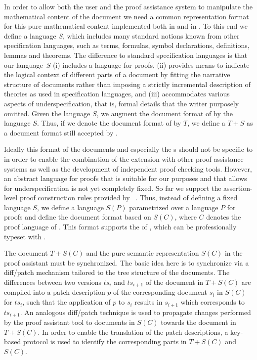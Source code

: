 In order to allow both the user and the proof assistance system to manipulate the
mathematical content of the document we need a common representation format for this pure
mathematical content implemented both in {\texmacs} and in {\OMEGA}. To this end we define
a language $S$, which includes many standard notions known from other specification
languages, such as terms, formulas, symbol declarations, definitions, lemmas and theorems.
The difference to standard specification languages is that our language~$S$ (i) includes a
language for proofs, (ii) provides means to indicate the logical context of different
parts of a document by fitting the narrative structure of documents rather than imposing a
strictly incremental description of theories as used in specification languages, and (iii)
accommodates various aspects of underspecification, that is, formal details that the
writer purposely omitted.  Given the language $S$, we augment the document format of
{\texmacs} by the language $S$.  Thus, if we denote the document format of {\texmacs} by
$T$, we define a {} $T+S$ as a document format still
accepted by {\texmacs}.

Ideally this format of the documents and especially the {s}
should not be specific to {\OMEGA} in order to enable the combination of the {\texmacs}
extension with other proof assistance systems as well as the development of independent
proof checking tools. However, an abstract language for proofs that is suitable for our
purposes and that allows for underspecification is not yet completely fixed. So far we
support the assertion-level proof construction rules provided by
{\CORE}~\cite{Aut03,Aut-05-a}. Thus, instead of defining a fixed language $S$, we define a
language $S(P)$ parametrized over a language $P$ for proofs and define the document
format based on $S(C)$, where $C$ denotes the proof language of {\CORE}. This format
supports the {\emph{}} of
{}, which can be professionally typeset with
{\texmacs}.

The {\texmacs} document $T+S(C)$ and the pure semantic representation $S(C)$ in the proof
assistant must be synchronized. The basic idea here is to synchronize via a diff/patch
mechanism tailored to the tree structure of the {\texmacs} documents. The differences
between two versions $ts_i$ and $ts_{i+1}$ of the document in $T+S(C)$ are compiled into a
patch description $p$ of the corresponding document $s_i$ in $S(C)$ for $ts_i$, such that
the application of $p$ to $s_i$ results in $s_{i+1}$ which corresponds to $ts_{i+1}$. An
analogous diff/patch technique is used to propagate changes performed by the proof
assistant tool to documents in $S(C)$ towards the {\texmacs} document in $T+S(C)$. In
order to enable the translation of the patch descriptions, a key-based protocol is used to
identify the corresponding parts in $T+S(C)$ and $S(C)$.

